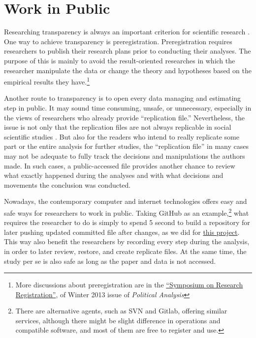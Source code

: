 
\section{Work in Public}

Researching transparency is always an important criterion for scientific research \citep{Appadurai2000, Denzin2009}. One way to achieve transparency is preregistration. Preregistration requires researchers to publish their research plans prior to conducting their analyses. The purpose of this is mainly to avoid the result-oriented researches in which the researcher manipulate the data or change the theory and hypotheses based on the empirical results they have.\footnote{More discussions about preregistration are in the \href{http://pan.oxfordjournals.org/content/21/1.toc}{``Symposium on Research Registration''}, of Winter 2013 issue of \textit{Political Analysis}}

Another route to transparency is to open every data managing and estimating step in public. It may sound time consuming, unsafe, or unnecessary, especially in the views of researchers who already provide ``replication file.'' Nevertheless, the issue is not only that the replication files are not always replicable in social scientific studies \citep{Chang2015,Jacoby2015,OpenScienceCollaboration2015}. But also for the readers who intend to really replicate some part or the entire analysis for further studies, the ``replication file'' in many cases may not be adequate to fully track the decisions and manipulations the authors made. In such cases, a public-accessed file provides another chance to review what exactly happened during the analyses and with what decisions and movements the conclusion was conducted. 

Nowadays, the contemporary computer and internet technologies offers easy and safe ways for researchers to work in public. Taking GitHub as an example,\footnote{There are alternative agents, such as SVN and Gitlab, offering similar services, although there might be slight difference in operations and compatible software, and most of them are free to register and use.} what requires the researcher to do is simply to spend 5 second to build a repository for later pushing updated committed file after changes, as we did for \href{https://github.com/fsolt/meritocracy-rep}{this project}. This way also benefit the researchers by recording every step during the analysis, in order to later review, restore, and create replicate files. At the same time, the study per se is also safe as long as the paper and data is not accessed. 




